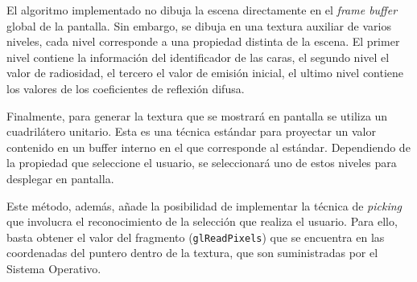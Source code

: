 El algoritmo implementado no dibuja la escena directamente en el \textit{frame buffer} global de la pantalla. Sin embargo, se dibuja en una textura auxiliar de varios niveles, cada nivel corresponde a una propiedad distinta de la escena. El primer nivel contiene la información del identificador de las caras, el segundo nivel el valor de radiosidad, el tercero el valor de emisión inicial, el ultimo nivel contiene los valores de los coeficientes de reflexión difusa.

Finalmente, para generar la textura que se mostrará en pantalla se utiliza un cuadrilátero unitario. Esta es una técnica estándar para proyectar un valor contenido en un buffer interno en el que corresponde al estándar. Dependiendo de la propiedad que seleccione el usuario, se seleccionará uno de estos niveles para desplegar en pantalla.

Este método, además, añade la posibilidad de implementar la técnica de \textit{picking} que involucra el reconocimiento de la selección que realiza el usuario. Para ello, basta obtener el valor del fragmento (\verb|glReadPixels|) que se encuentra en las coordenadas del puntero dentro de la textura, que son suministradas por el Sistema Operativo.

